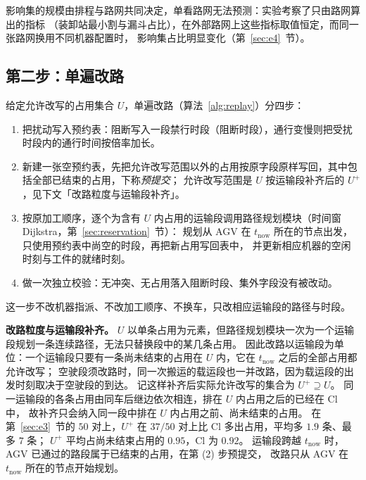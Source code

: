 \documentclass[manuscript,screen,review]{acmart}
\newcommand{\NPairs}{50}
\newcommand{\ClosureAliveFrac}{92\%}
\newcommand{\ClosureShareMean}{0.92} %
\newcommand{\SegExtraPairs}{37/\NPairs}  %
\newcommand{\SegExtraMean}{1.9}          %
\newcommand{\SegExtraMax}{7}             %
\newcommand{\SegShare}{0.95}             %
\begin{document}
影响集的规模由排程与路网共同决定，单看路网无法预测：实验考察了只由路网算出的指标
（装卸站最小割与漏斗占比），在外部路网上这些指标取值恒定，而同一张路网换用不同机器配置时，
影响集占比明显变化（第~\ref{sec:e4}~节）。

\subsection{第二步：单遍改路}
\label{sec:level1}

给定允许改写的占用集合 \(U\)，单遍改路（算法~\ref{alg:replay}）分四步：
\begin{enumerate}[label=(\arabic*),leftmargin=2em,itemsep=0.15em]
\item 把扰动写入预约表：阻断写入一段禁行时段（阻断时段），通行变慢则把受扰时段内的通行时间按倍率加长。
\item 新建一张空预约表，先把允许改写范围以外的占用按原字段原样写回，其中包括全部已结束的占用，下称\emph{预提交}；
允许改写范围是 \(U\) 按运输段补齐后的 \(U^{+}\)，见下文「改路粒度与运输段补齐」。
\item 按原加工顺序，逐个为含有 \(U\) 内占用的运输段调用路径规划模块（时间窗 Dijkstra，第~\ref{sec:reservation}~节）：
规划从 AGV 在 \(t_{\mathrm{now}}\) 所在的节点出发，只使用预约表中尚空的时段，再把新占用写回表中，
并更新相应机器的空闲时刻与工件的就绪时刻。
\item 做一次独立校验：无冲突、无占用落入阻断时段、集外字段没有被改动。
\end{enumerate}
这一步不改机器指派、不改加工顺序、不换车，只改相应运输段的路径与时段。

\textbf{改路粒度与运输段补齐。}
\(U\) 以单条占用为元素，但路径规划模块一次为一个运输段规划一条连续路径，无法只替换段中的某几条占用。
因此改路以运输段为单位：一个运输段只要有一条尚未结束的占用在 \(U\) 内，它在 \(t_{\mathrm{now}}\) 之后的全部占用都允许改写；
空驶段须改路时，同一次搬运的载运段也一并改路，因为载运段的出发时刻取决于空驶段的到达。
记这样补齐后实际允许改写的集合为 \(U^{+}\supseteq U\)。
同一运输段的各条占用由同车后继边依次相连，排在 \(U\) 内占用之后的已经在 \(\mathrm{Cl}\) 中，
故补齐只会纳入同一段中排在 \(U\) 内占用之前、尚未结束的占用。
在第~\ref{sec:e3}~节的 \(\NPairs\) 对上，\(U^{+}\) 在 \(\SegExtraPairs\) 对上比 \(\mathrm{Cl}\) 多出占用，平均多 \(\SegExtraMean\) 条、最多 \(\SegExtraMax\) 条；
\(U^{+}\) 平均占尚未结束占用的 \(\SegShare\)，\(\mathrm{Cl}\) 为 \(\ClosureShareMean\)。
运输段跨越 \(t_{\mathrm{now}}\) 时，AGV 已通过的路段属于已结束的占用，在第 (2) 步预提交，
改路只从 AGV 在 \(t_{\mathrm{now}}\) 所在的节点开始规划。
\end{document}
